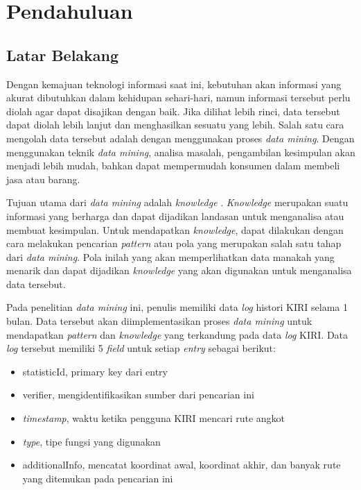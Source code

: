 \chapter{Pendahuluan}
\label{chap:intro}

\section{Latar Belakang}
\label{sec:motivation}

Dengan kemajuan teknologi informasi saat ini, kebutuhan akan informasi yang akurat dibutuhkan dalam kehidupan sehari-hari, namun informasi tersebut perlu diolah agar dapat disajikan dengan baik. Jika dilihat lebih rinci, data tersebut dapat diolah lebih lanjut dan menghasilkan sesuatu yang lebih. Salah satu cara mengolah data tersebut adalah dengan menggunakan proses \textsl{data mining}. Dengan menggunakan teknik \textsl{data mining}, analisa masalah, pengambilan kesimpulan akan menjadi lebih mudah, bahkan dapat mempermudah konsumen dalam membeli jasa atau barang.

Tujuan utama dari \textsl{data mining} adalah \textsl{knowledge} \cite{DM}. \textsl{Knowledge} merupakan suatu informasi yang berharga dan dapat dijadikan landasan untuk menganalisa atau membuat kesimpulan. Untuk mendapatkan \textsl{knowledge}, dapat dilakukan dengan cara melakukan pencarian \textsl{pattern} atau pola yang merupakan salah satu tahap dari \textsl{data mining}. Pola inilah yang akan memperlihatkan data manakah yang menarik dan dapat dijadikan \textsl{knowledge} yang akan digunakan untuk menganalisa data tersebut.

Pada penelitian \textsl{data mining} ini, penulis memiliki data \textsl{log} histori KIRI selama 1 bulan. Data tersebut akan diimplementasikan proses \textsl{data mining} untuk mendapatkan \textsl{pattern} dan \textsl{knowledge} yang terkandung pada data \textsl{log} KIRI. Data \textsl{log} tersebut memiliki 5 \textsl{field} untuk setiap \textsl{entry} sebagai berikut:
\begin{itemize}
	\item statisticId, primary key dari entry
	\item verifier, mengidentifikasikan sumber dari pencarian ini
	\item \textsl{timestamp}, waktu ketika pengguna KIRI mencari rute angkot
	\item \textsl{type}, tipe fungsi yang digunakan
	\item additionalInfo, mencatat koordinat awal, koordinat akhir, dan banyak rute yang ditemukan pada pencarian ini
\end{itemize}
  
